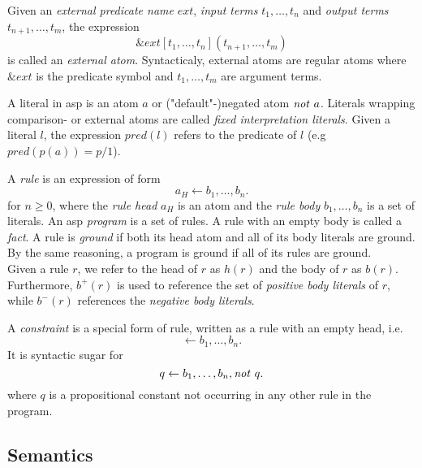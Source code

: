 \begin{definition}
\label{def:prelims-asp-syntax-ext-atom}
Given an \emph{external predicate name} $\mathit{ext}$, \emph{input terms} $t_1,\ldots,t_n$ and \emph{output terms} $t_{n+1},\ldots,t_m$, the expression
\[
	\&\mathit{ext}[t_1,\ldots,t_n](t_{n+1},\ldots,t_m)
\]
is called an \emph{external atom}. Syntacticaly, external atoms are regular atoms where $\&\mathit{ext}$ is the predicate symbol and $t_1,\ldots,t_m$ are argument terms.
\end{definition}

\begin{definition}[Literal]
\label{def:prelims-asp-syntax-literal}
A literal in \gls{asp} is an atom $a$ or ("default"-)negated atom $\mathit{not}\ a$. Literals wrapping comparison- or external atoms are called \emph{fixed interpretation literals}. Given a literal $l$, the expression $pred(l)$ refers to the predicate of $l$ (e.g $pred(p(a)) = p/1$).
\end{definition}

\begin{definition}
\label{def:prelims-asp-syntax-rule}
A \emph{rule} is an expression of form
\[
	a_H \leftarrow b_1,\ldots,b_n.
\]
for $n \geq 0$, where the \emph{rule head} $a_H$ is an atom and the \emph{rule body} $b_1,\ldots,b_n$ is a set of literals. An \gls{asp} \emph{program} is a set of rules. A rule with an empty body is called a \emph{fact}. A rule is \emph{ground} if both its head atom and all of its body literals are ground. By the same reasoning, a program is ground if all of its rules are ground.\\
Given a rule $r$, we refer to the head of $r$ as $h(r)$ and the body of $r$ as $b(r)$. Furthermore, $b^+(r)$ is used to reference the set of \emph{positive body literals} of $r$, while $b^-(r)$ references the \emph{negative body literals}. 
\end{definition}

\begin{definition}[Constraint]
\label{def:prelims-asp-syntax-constraint}
A \emph{constraint} is a special form of rule, written as a rule with an empty head, i.e.
\[
	\leftarrow b_1,\ldots,b_n.
\]
It is syntactic sugar for
\[
	q \leftarrow b_1,\ldots,b_n, \mathit{not}\ q.
\]
where $q$ is a propositional constant not occurring in any other rule in the program.
\end{definition}

\subsection{Semantics}
\label{subsec:prelims-asp-semantics}

